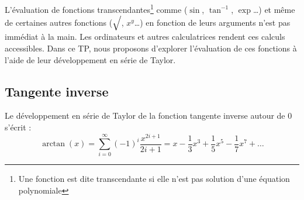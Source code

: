 
L'évaluation  de  fonctions transcendantes\footnote{Une  fonction  est
  dite  transcendante  si  elle  n'est  pas  solution  d'une  équation
  polynomiale} comme ($\sin $, $\tan^{-1}$,  $\exp $\ldots) et même de
certaines autres fonctions  ($\sqrt{\strut}$, $x^y$\ldots) en fonction
de leurs  arguments n'est pas immédiat  à la main. Les  ordinateurs et
autres calculatrices rendent ces calculs accessibles. Dans ce TP, nous
proposons d'explorer  l'évaluation de ces  fonctions à l'aide  de leur
développement en série de Taylor.



\subsection{Tangente inverse}

Le développement en série de Taylor de la fonction tangente inverse autour de 0
s'écrit :
\begin{equation}
\arctan(x) = \sum_{i=0}^\infty (-1)^i\frac{x^{2i+1}}{2i+1}
=x -\frac{1}{3}x^3 + \frac{1}{5}x^5-\frac{1}{7}x^7+\ldots
\end{equation}

